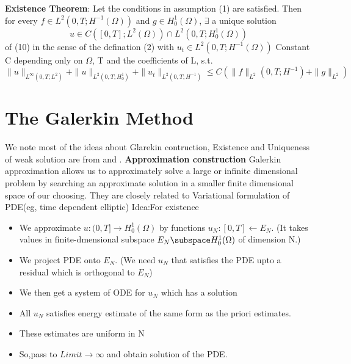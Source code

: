 \textbf{Existence Theorem}: Let the conditions in assumption (1) are satisfied. Then for every $f \in L^{2}(0,T;H^{-1}(\Omega))$ and $g \in H_{0}^{1}(\Omega)$, $\exists$ a unique solution\\
\[ u \in C([0,T];L^{2}(\Omega)) \cap L^{2}(0,T;H_{0}^{1}(\Omega))
\]
of (10) in the sense of the defination (2) with $u_{t} \in L^{2}(0,T;H^{-1}(\Omega))$
Constant C depending only on $\Omega$, T and the coefficients of L, s.t. \\
\[
\|u\|_{L^{\infty}(0,T;L^{2})}+\|u\|_{L^{2}(0,T;H_{0}^{1})}+\|u_{t}\|_{L^{2}(0,T;H^{-1})} \leq C(\|f\|_{L^{2}}(0,T;H^{-1})+\|g\|_{L^{2}})
\]
















\section{The Galerkin Method}
We note most of the ideas about Glarekin contruction, Existence and Uniqueness of weak solution are from \cite{lecture2} and \cite{evans}.
\textbf{Approximation construction}
Galerkin approximation allows us to approximately solve a large or infinite dimensional problem by searching an approximate solution in a smaller finite dimensional space of our choosing. They are closely related to Variational formulation of PDE(eg, time dependent elliptic)
Idea:For existence\\
\begin{itemize}
    \item We approximate $u: (0,T] \rightarrow H_{0}^{1}(\Omega)$ by functions $u_{N}: [0,T] \leftarrow E_{N}$. (It takes values in finite-dmensional subspace $E_{N} \subspace H_{0}^{1}(\Omega)$ of dimension N.)
    \item We project PDE onto $E_{N}$. (We need $u_{N}$ that satisfies the PDE upto a residual which is orthogonal to $E_{N}$)
    \item We then get a system of ODE for $u_{N}$ which has a solution
    \item All $u_{N}$ satisfies energy estimate of the same form as the priori estimates.
    \item These estimates are uniform in N
    \item So,pass to $Limit \rightarrow \infty $ and obtain solution of the PDE.
\end{itemize}\\

